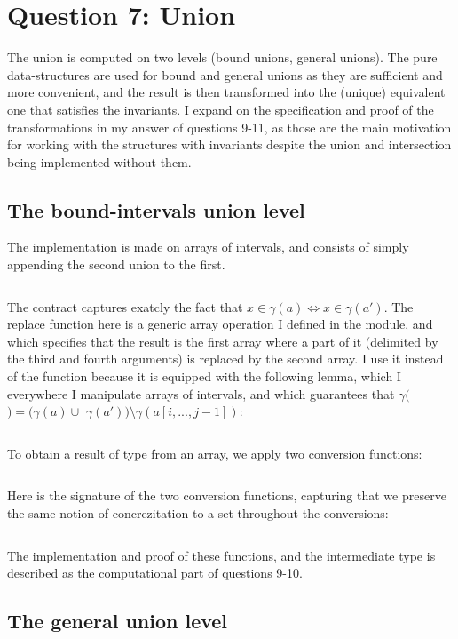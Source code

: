 \section{Question 7: Union}\label{q6}
%
The union is computed on two levels (bound unions, general unions).
The pure data-structures are used for bound and general unions as they are sufficient
and more convenient,
%
and the result is then transformed into the (unique) equivalent one that satisfies
the invariants. I expand on the specification and proof of the transformations in my
answer of questions 9-11, as those are the main motivation for working with the
structures with invariants despite the union and intersection being implemented
without them.


\subsection{The bound-intervals union level}

The implementation is made on arrays of intervals, and consists of simply appending
the second union to the first.
%
\inputminted{\whyml}{why3code/gen_union_union.mlw}
%
The contract captures exatcly the fact that $x\in \gamma(a) \iff x\in\gamma(a')$. The
replace function here is a generic array operation I defined in the 
module, and which specifies that the result is the first array where a part of it
(delimited by the third and fourth arguments) is replaced by the second array.
%
I use it instead of the  function because it is equipped with
the following lemma, which I everywhere I manipulate arrays of intervals, and which
guarantees that $\gamma($$) = (\gamma(a) \cup$
$\gamma(a'))\setminus\gamma(a[i,...,j-1])$:
\inputminted{\whyml}{why3code/replace_lemma.mlw}

To obtain a result of type  from an array, we apply two
conversion functions:
\inputminted{\whyml}{why3code/union_union.mlw}

Here is the signature of the two conversion functions, capturing that we preserve the
same notion of concrezitation to a set throughout the conversions:
\inputminted{\whyml}{why3code/bound_convs_contracts.mlw}

The implementation and proof of these functions, and the 
intermediate type is described as the computational part of questions 9-10.

\subsection{The general union level}

